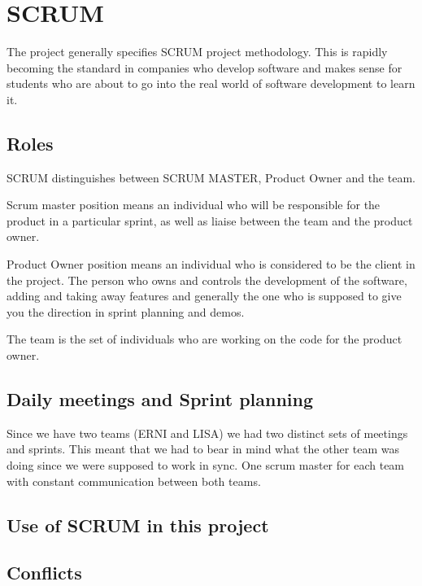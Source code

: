 \section{SCRUM}
The project generally specifies SCRUM project methodology. This is rapidly becoming the standard in companies who develop software and makes sense for students who are about to go into the real world of software development to learn it.

\subsection{Roles}

SCRUM distinguishes between SCRUM MASTER, Product Owner and the team. 

Scrum master position means an individual who will be responsible for the product in a particular sprint, as well as liaise between the team and the product owner.

Product Owner position means an individual who is considered to be the client in the project. The person who owns and controls the development of the software, adding and taking away features and generally the one who is supposed to give you the direction in sprint planning and demos.

The team is the set of individuals who are working on the code for the product owner.

\subsection{Daily meetings and Sprint planning}

Since we have two teams (ERNI and LISA) we had two distinct sets of meetings and sprints. This meant that we had to bear in mind what the other team was doing since we were supposed to work in sync. One scrum master for each team with constant communication between both teams. 

\subsection{Use of SCRUM in this project}

\subsection{Conflicts}